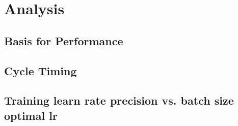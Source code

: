 \chapter{Analysis}\label{analysis}
\section{Basis for Performance}
\section{Cycle Timing}
\section{Training learn rate precision vs. batch size optimal lr}

